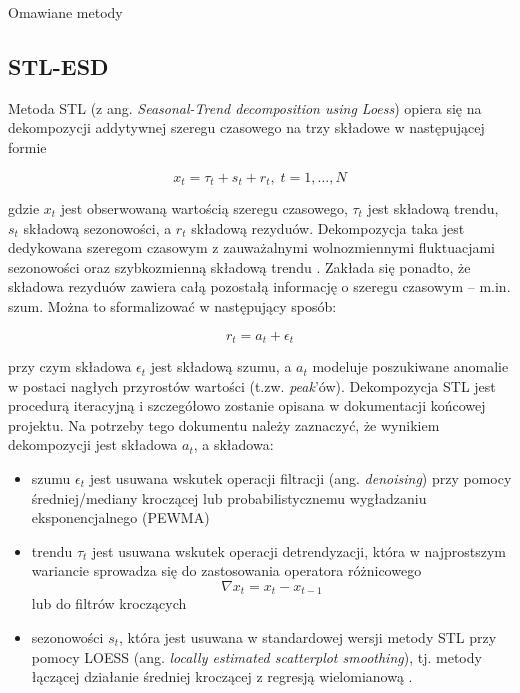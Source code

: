 \documentclass{article}
\begin{document}
Omawiane metody

\hypertarget{stl-esd}{%
\subsection{STL-ESD}\label{stl-esd}}

Metoda STL (z ang. \emph{Seasonal-Trend decomposition using Loess})
opiera się na dekompozycji addytywnej szeregu czasowego na trzy składowe
w następującej formie

\begin{equation*}
x_{t} = \tau_{t} + s_{t} + r_{t},\; t = 1, \dots, N
\end{equation*}



gdzie \(x_{t}\) jest obserwowaną wartością szeregu czasowego,
\(\tau_{t}\) jest składową trendu, \(s_{t}\) składową sezonowości, a
\(r_{t}\) składową rezyduów. Dekompozycja taka jest dedykowana szeregom
czasowym z zauważalnymi wolnozmiennymi fluktuacjami sezonowości oraz
szybkozmienną składową trendu \cite{wen-gao}. Zakłada się
ponadto, że składowa rezyduów zawiera całą pozostałą informację o
szeregu czasowym -- m.in. szum. Można to sformalizować w następujący
sposób:

\begin{equation*}
  r_{t} = a_{t} + \epsilon_{t}
\end{equation*}



przy czym składowa \(\epsilon_{t}\) jest składową szumu, a \(a_{t}\)
modeluje poszukiwane anomalie w postaci nagłych przyrostów wartości
(t.zw. \emph{peak}'ów). Dekompozycja STL jest procedurą iteracyjną i
szczegółowo zostanie opisana w dokumentacji końcowej projektu. Na
potrzeby tego dokumentu należy zaznaczyć, że wynikiem dekompozycji jest
składowa \(a_{t}\), a składowa:

\begin{itemize}
\item
  szumu \(\epsilon_{t}\) jest usuwana wskutek operacji filtracji (ang.
  \emph{denoising}) przy pomocy średniej/mediany kroczącej lub
  probabilistycznemu wygładzaniu eksponencjalnego (PEWMA) \cite{PEWMA}
\item
  trendu \(\tau_{t}\) jest usuwana wskutek operacji detrendyzacji, która
  w najprostszym wariancie sprowadza się do zastosowania operatora
  różnicowego \begin{equation*} \nabla x_{t} = x_{t} - x_{t -1} \end{equation*}
    lub do filtrów kroczących
\item
  sezonowości \(s_{t}\), która jest usuwana w standardowej wersji
  metody STL przy pomocy LOESS (ang. \emph{locally estimated scatterplot
  smoothing}), tj. metody łączącej działanie średniej kroczącej z
  regresją wielomianową \cite{stl-origin}.
\end{itemize}
\end{document}
